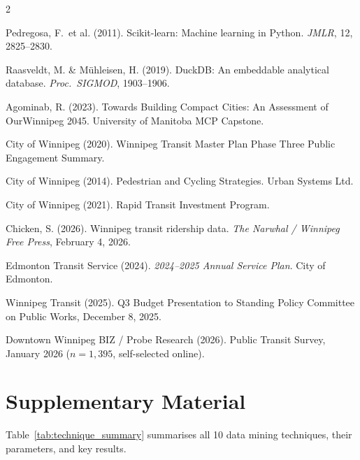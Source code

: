 \documentclass[11pt]{article}
\begin{document}
{\begin{multicols}{2}
\begin{enumerate}[label={[\arabic*]}]
\item Pedregosa, F.~et al. (2011). Scikit-learn: Machine learning in Python. \emph{JMLR}, 12, 2825--2830.
\item Raasveldt, M. \& M\"uhleisen, H. (2019). DuckDB: An embeddable analytical database. \emph{Proc.~SIGMOD}, 1903--1906.
\item Agominab, R. (2023). Towards Building Compact Cities: An Assessment of OurWinnipeg 2045. University of Manitoba MCP Capstone.
\item City of Winnipeg (2020). Winnipeg Transit Master Plan Phase Three Public Engagement Summary.
\item City of Winnipeg (2014). Pedestrian and Cycling Strategies. Urban Systems Ltd.
\item City of Winnipeg (2021). Rapid Transit Investment Program.
\item Chicken, S. (2026). Winnipeg transit ridership data. \emph{The Narwhal / Winnipeg Free Press}, February 4, 2026.
\item Edmonton Transit Service (2024). \emph{2024--2025 Annual Service Plan}. City of Edmonton.
\item Winnipeg Transit (2025). Q3 Budget Presentation to Standing Policy Committee on Public Works, December 8, 2025.
\item Downtown Winnipeg BIZ / Probe Research (2026). Public Transit Survey, January 2026 ($n=1{,}395$, self-selected online).
\end{enumerate}
\end{multicols}
}

\appendix

\section{Supplementary Material}

Table~\ref{tab:technique_summary} summarises all 10 data mining techniques,
their parameters, and key results.
\end{document}
